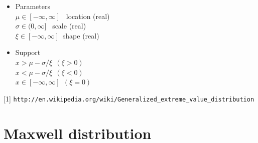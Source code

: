 \begin{itemize}
\item Parameters\\
  $\mu \in [-\infty,\infty]$ \, location (real)\\
  $\sigma \in (0,\infty]$ \, scale (real)\\
  $\xi\in [-\infty,\infty]$\, shape (real)
\item Support\\
  $x>\mu-\sigma/\xi\,\;(\xi > 0)$ \\
  $x<\mu-\sigma/\xi\,\;(\xi < 0)$ \\
  $x \in [-\infty,\infty]\,\;(\xi = 0)$
\end{itemize}
[1]
\verb"http://en.wikipedia.org/wiki/Generalized_extreme_value_distribution"


\clearpage
\section{Maxwell distribution}

